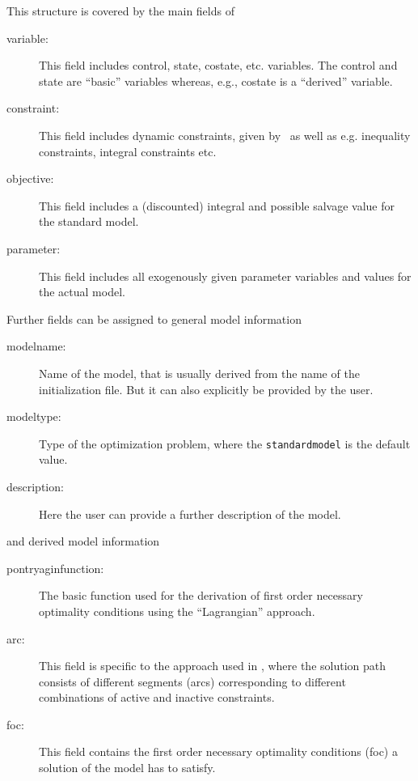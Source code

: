 This structure is covered by the main fields of \ocStruct
\begin{description}
	\item[variable:] This field includes control, state, costate, etc. variables. The control and state are ``basic'' variables whereas, e.g., costate is a ``derived'' variable.
	\item[constraint:] This field includes dynamic constraints, given by \ODEs\ as well as e.g. inequality constraints, integral constraints etc.
	\item[objective:] This field includes a (discounted) integral and possible salvage value for the standard model.
	\item[parameter:] This field includes all exogenously given parameter variables and values for the actual model.
\end{description}
Further fields can be assigned to general model information
\begin{description}
	\item[modelname:] Name of the model, that is usually derived from the name of the initialization file. But it can also explicitly be provided by the user.
	\item[modeltype:] Type of the optimization problem, where the \lstinline+standardmodel+ is the default value.
	\item[description:] Here the user can provide a further description of the model.
\end{description}
and derived model information
\begin{description}
	\item[pontryaginfunction:] The basic function used for the derivation of first order necessary optimality conditions using the ``Lagrangian'' approach.
	\item[arc:] This field is specific to the approach used in \OCMAT, where the solution path consists of different segments (arcs) corresponding to different combinations of active and inactive constraints.
	\item[foc:] This field contains the first order necessary optimality conditions (foc) a solution of the model has to satisfy.
\end{description}


